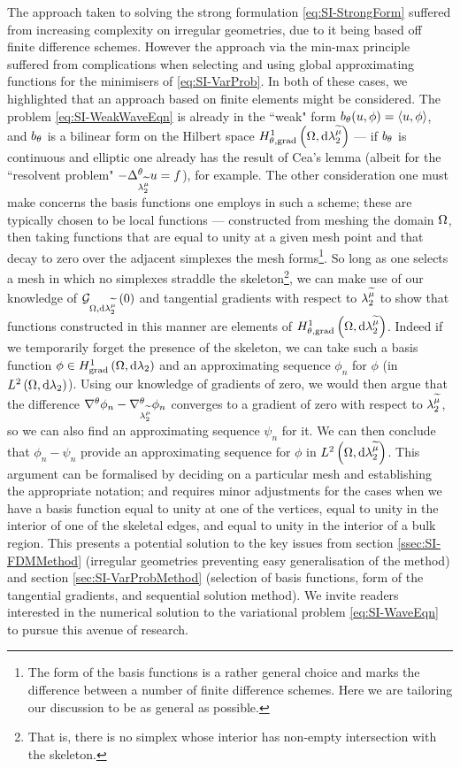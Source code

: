 The approach taken to solving the strong formulation \eqref{eq:SI-StrongForm} suffered from increasing complexity on irregular geometries, due to it being based off finite difference schemes.
However the approach via the min-max principle suffered from complications when selecting and using global approximating functions for the minimisers of \eqref{eq:SI-VarProb}.
In both of these cases, we highlighted that an approach based on finite elements might be considered.
The problem \eqref{eq:SI-WeakWaveEqn} is already in the ``weak" form $b_{\theta}(u,\phi)=\left\langle u , \phi \right\rangle$, and $b_{\theta}$ is a bilinear form on the Hilbert space $H^1_{\theta, \mathrm{grad}}\left( \Omega, \mathrm{d}\lambda_2^{\widetilde{\mu}} \right)$ --- if $b_{\theta}$ is continuous and elliptic one already has the result of Cea's lemma (albeit for the ``resolvent problem" $-\Delta_{\lambda_2^{\widetilde{\mu}}}^\theta u=f$), for example.
The other consideration one must make concerns the basis functions one employs in such a scheme; these are  typically chosen to be local functions --- constructed from meshing the domain $\Omega$, then taking functions that are equal to unity at a given mesh point and that decay to zero over the adjacent simplexes the mesh forms\footnote{The form of the basis functions is a rather general choice and marks the difference between a number of finite difference schemes. Here we are tailoring our discussion to be as general as possible.}.
So long as one selects a mesh in which no simplexes straddle the skeleton\footnote{That is, there is no simplex whose interior has non-empty intersection with the skeleton.}, we can make use of our knowledge of $\mathcal{G}_{ \Omega, \mathrm{d}\lambda_2^{\widetilde{\mu}}}\left( 0 \right)$ and tangential gradients with respect to $\lambda_2^{\widetilde{\mu}}$ to show that functions constructed in this manner are elements of $H^1_{\theta, \mathrm{grad}}\left( \Omega, \mathrm{d}\lambda_2^{\widetilde{\mu}} \right)$.
Indeed if we temporarily forget the presence of the skeleton, we can take such a basis function $\phi\in H^1_\mathrm{grad}\left( \Omega, \mathrm{d}\lambda_2 \right)$ and an approximating sequence $\phi_n$ for $\phi$ (in $L^{2}\left( \Omega,\mathrm{d} \lambda_2 \right)$).
Using our knowledge of gradients of zero, we would then argue that the difference $\nabla^{\theta}\phi_n - \nabla^{\theta}_{\lambda_2^{\widetilde{\mu}}}\phi_n$ converges to a gradient of zero with respect to $\lambda_2^{\widetilde{\mu}}$, so we can also find an approximating sequence $\psi_n$ for it.
We can then conclude that $\phi_n-\psi_n$ provide an approximating sequence for $\phi$ in $L^{2}\left( \Omega,\mathrm{d} \lambda_2^{\widetilde{\mu}} \right)$.
This argument can be formalised by deciding on a particular mesh and establishing the appropriate notation; and requires minor adjustments for the cases when we have a basis function equal to unity at one of the vertices, equal to unity in the interior of one of the skeletal edges, and equal to unity in the interior of a bulk region.
This presents a potential solution to the key issues from section \ref{ssec:SI-FDMMethod} (irregular geometries preventing easy generalisation of the method) and section \ref{sec:SI-VarProbMethod} (selection of basis functions, form of the tangential gradients, and sequential solution method).
We invite readers interested in the numerical solution to the variational problem \eqref{eq:SI-WaveEqn} to pursue this avenue of research.

